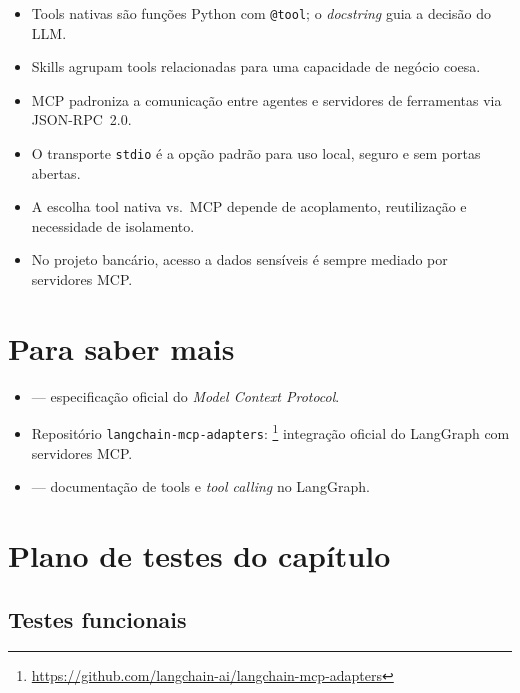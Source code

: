 \begin{itemize}[leftmargin=*]
  \item Tools nativas s\~ao fun\c{c}\~oes Python com \texttt{@tool};
        o \textit{docstring} guia a decis\~ao do LLM.
  \item Skills agrupam tools relacionadas para uma capacidade de
        neg\'ocio coesa.
  \item MCP padroniza a comunica\c{c}\~ao entre agentes e servidores
        de ferramentas via JSON-RPC~2.0.
  \item O transporte \texttt{stdio} \'e a op\c{c}\~ao padr\~ao para
        uso local, seguro e sem portas abertas.
  \item A escolha tool nativa vs.\ MCP depende de acoplamento,
        reutiliza\c{c}\~ao e necessidade de isolamento.
  \item No projeto banc\'ario, acesso a dados sensíveis \'e sempre
        mediado por servidores MCP.
\end{itemize}

\section{Para saber mais}

\begin{itemize}[leftmargin=*]
  \item {} --- especifica\c{c}\~ao oficial do
        \textit{Model Context Protocol}.
  \item Reposit\'orio \texttt{langchain-mcp-adapters}:
        \footnote{\url{https://github.com/langchain-ai/langchain-mcp-adapters}}
        integra\c{c}\~ao oficial do LangGraph com servidores MCP.
  \item {} --- documenta\c{c}\~ao de tools
        e \textit{tool calling} no LangGraph.
\end{itemize}

\section{Plano de testes do cap\'itulo}

\subsection{Testes funcionais}

